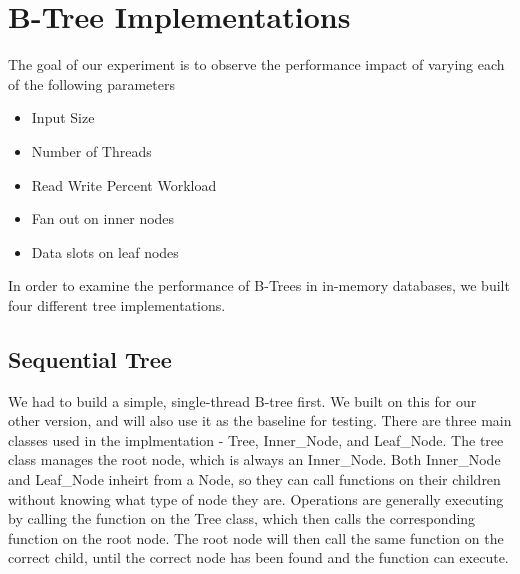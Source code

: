 \documentclass{sig-alternate}
\begin{document}
\section{B-Tree Implementations}
The goal of our experiment is to observe the performance impact of varying each of the following parameters 
\begin{itemize}
  \item Input Size
  \item Number of Threads
  \item Read Write Percent Workload
  \item Fan out on inner nodes
  \item Data slots on leaf nodes
\end{itemize}
In order to examine the performance of B-Trees in in-memory databases, we built four different tree implementations.
\subsection{Sequential Tree}
We had to build a simple, single-thread B-tree first.  We built on this for our other version, and will also use it as the baseline for testing.  There are three main classes used in the implmentation - Tree, Inner\_Node, and Leaf\_Node.  The tree class manages the root node, which is always an Inner\_Node.  Both Inner\_Node and Leaf\_Node inheirt from a Node, so they can call functions on their children without knowing what type of node they are.  Operations are generally executing by calling the function on the Tree class, which then calls the corresponding function on the root node.  The root node will then call the same function on the correct child, until the correct node has been found and the function can execute.
\end{document}

